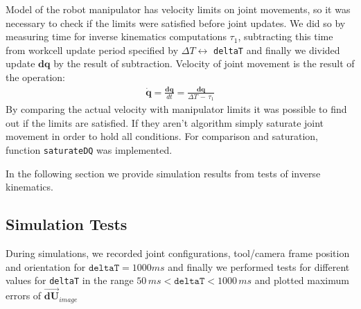 \documentclass[]{scrartcl}
\begin{document}
Model of the robot manipulator has velocity limits on joint movements, so it was necessary to check if the limits were satisfied before joint updates. We did so by measuring time for inverse kinematics computations $\tau_1$, subtracting this time from workcell update period specified by $\Delta T \longleftrightarrow$ \texttt{deltaT} and finally we divided update $\boldsymbol{dq}$ by the result of subtraction. Velocity of joint movement is the result of the operation:
\begin{align}
	\boldsymbol{\dot{q}} = \frac{\boldsymbol{dq}}{dt} = \frac{\boldsymbol{dq}}{\Delta T\, -\, \tau_1}
\end{align}
By comparing the actual velocity with manipulator limits it was possible to find out if the limits are satisfied. If they aren't algorithm simply saturate joint movement in order to hold all conditions. For comparison and saturation, function \texttt{saturateDQ} was implemented.

In the following section we provide simulation results from tests of inverse kinematics.

\subsection{Simulation Tests}
During simulations, we recorded joint configurations, tool/camera frame position and orientation for $\texttt{deltaT} = 1000 ms$ and finally we performed tests for different values for \texttt{deltaT} in the range $50\, ms < \texttt{deltaT} < 1000\, ms$ and plotted maximum errors of 
$\overrightarrow{\boldsymbol{dU}}_{image}$
\end{document}
